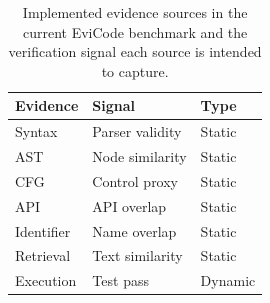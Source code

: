 \begin{table}[!htbp]
\centering
\scriptsize
\begin{tabular}{lll}
\toprule
Evidence & Signal & Type \\
\midrule
Syntax & Parser validity & Static \\
AST & Node similarity & Static \\
CFG & Control proxy & Static \\
API & API overlap & Static \\
Identifier & Name overlap & Static \\
Retrieval & Text similarity & Static \\
Execution & Test pass & Dynamic \\
\bottomrule
\end{tabular}
\vspace{0.5em}
\caption{Implemented evidence sources in the current EviCode benchmark and the verification signal each source is intended to capture.}
\label{tab:evidence-summary}
\end{table}
